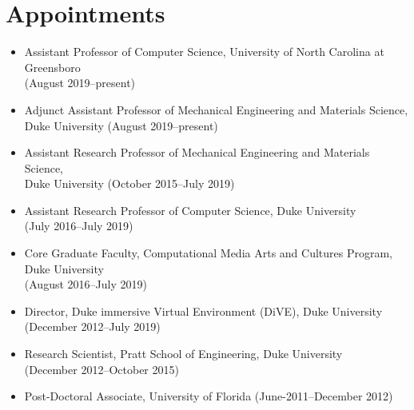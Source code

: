 \documentclass[wideaddress]{vitae}
\author{Regis Kopper}
\begin{document}
\maketitle


\section{Appointments}
\begin{itemize}
	\item{Assistant Professor of Computer Science, University of North Carolina at Greensboro\\(August 2019--present)}
	\item{Adjunct Assistant Professor of Mechanical Engineering and Materials Science,\\Duke University (August 2019--present)}
	\item{Assistant Research Professor of Mechanical Engineering and Materials Science,\\Duke University (October 2015--July 2019)}
	\item{Assistant Research Professor of Computer Science, Duke University\\(July 2016--July 2019)}
	\item{Core Graduate Faculty, Computational Media Arts and Cultures Program, Duke University\\(August 2016--July 2019)}
	\item{Director, Duke immersive Virtual Environment (DiVE), Duke University\\(December 2012--July 2019)}
	\item{Research Scientist, Pratt School of Engineering, Duke University\\(December 2012--October 2015)}
	\item{Post-Doctoral Associate, University of Florida (June-2011--December 2012)}
\end{itemize}
\end{document}
